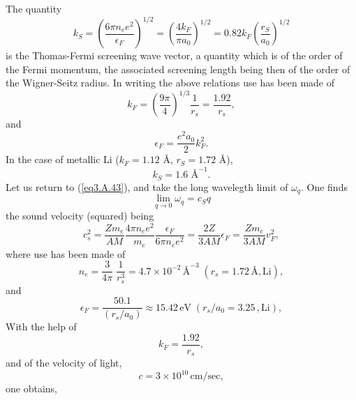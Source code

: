 \begin{subappendices}
\begin{equation}
\end{equation}
The quantity
\begin{equation}\label{eq3.A.43}
k_S=\left(\frac{6\pi n_ee^2}{\epsilon_F}\right)^{1/2}=\left(\frac{4k_F}{\pi a_0}\right)^{1/2}=0.82 k_F\left(\frac{r_S}{a_0}\right)^{1/2}
\end{equation}
is the Thomas-Fermi screening wave vector, a quantity which is of the order of the Fermi momentum, the associated screening length being then of the order of the Wigner-Seitz radius. In writing the above relations use has been made of
\begin{equation}\label{eq3.A.44b}
k_F=\left(\frac{9\pi}{4}\right)^{1/3}\frac{1}{r_s}=\frac{1.92}{r_s},
\end{equation}
and
\begin{equation}\label{eq3.A.44}
\epsilon_F=\frac{e^2a_0}{2}k_F^2.
\end{equation}
 In the case of metallic Li ($k_F=1.12$ \AA, $r_S=1.72$ \AA),
\begin{equation}\label{eq3.A.45}
k_S=1.6\text{ \AA}^{-1}.
\end{equation}
 Let us return to (\ref{eq3.A.43}), and take the long wavelegth limit of $\omega_q$. One finds
\begin{equation}\label{eq3.A.46}
\lim_{q\to0}\omega_q=c_Sq
\end{equation}
 the sound velocity (squared) being 
\begin{equation}\label{eqC2AppA8}
c_s^2=\frac{Zm_e}{AM}\frac{4\pi n_ee^2}{m_e}\frac{\epsilon_F}{6\pi n_e e^2}=\frac{2Z}{3 AM}\epsilon_F=\frac{Zm_e}{3 AM}v_F^2,
\end{equation}
where use has been made of
\begin{equation}\label{eqC2AppA56}
n_e=\frac{3}{4\pi}\;\frac{1}{r_s^3}=4.7\times10^{-2}\,\text{\AA}^{-3}\;(r_s=1.72\,\text{\AA},\text{Li}),
\end{equation}
and
\begin{equation}\label{eqC2AppA57}
\epsilon_F=\frac{50.1}{(r_s/a_0)}\approx 15.42\,\text{eV}\;(r_s/a_0=3.25\,,\text{Li}),
\end{equation}
With the help of
\begin{equation}\label{eqC2AppA9}
k_F=\frac{1.92}{r_s},
\end{equation}
 and of the velocity of light,
\begin{equation}\label{eqC2AppA10}
c=3\times 10^{10}\,\text{cm/sec},
\end{equation}
one obtains,
\begin{align}\label{eqC2AppA11}

\end{align}
\end{subappendices}
